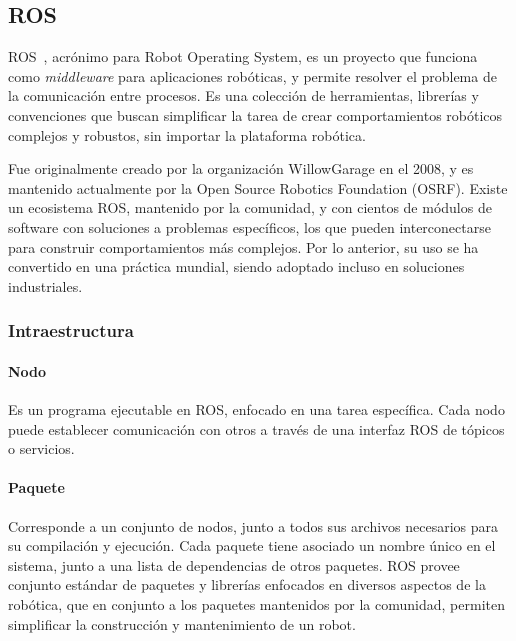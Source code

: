 \subsection{ROS}

ROS~\cite{ROS:2009}, acrónimo para Robot Operating System, es un proyecto que funciona como \textit{middleware} para aplicaciones robóticas, y permite resolver el problema de la comunicación entre procesos. Es una colección de herramientas, librerías y convenciones que buscan simplificar la tarea de crear comportamientos robóticos complejos y robustos, sin importar la plataforma robótica.

Fue originalmente creado por la organización WillowGarage en el 2008, y es mantenido actualmente por la Open Source Robotics Foundation (OSRF). Existe un ecosistema ROS, mantenido por la comunidad, y con cientos de módulos de software con soluciones a problemas específicos, los que pueden interconectarse para construir comportamientos más complejos. Por lo anterior, su uso se ha convertido en una práctica mundial, siendo adoptado incluso en soluciones industriales.

\subsubsection{Intraestructura}

\paragraph{Nodo}
Es un programa ejecutable en ROS, enfocado en una tarea específica. Cada nodo puede establecer comunicación con otros a través de una interfaz ROS de tópicos o servicios.

\paragraph{Paquete}
Corresponde a un conjunto de nodos, junto a todos sus archivos necesarios para su compilación y ejecución. Cada paquete tiene asociado un nombre único en el sistema, junto a una lista de dependencias de otros paquetes. ROS provee conjunto estándar de paquetes y librerías enfocados en diversos aspectos de la robótica, que en conjunto a los paquetes mantenidos por la comunidad, permiten simplificar la construcción y mantenimiento de un robot.


